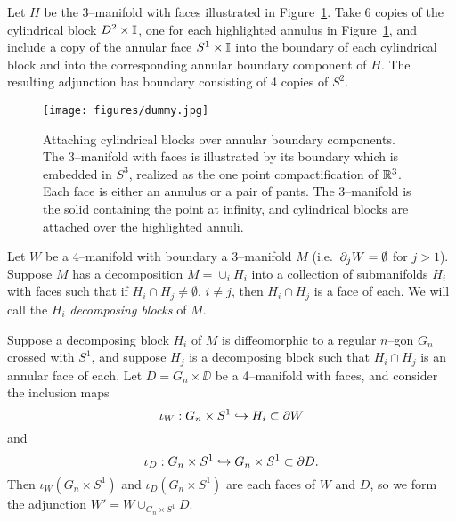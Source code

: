 \begin{ex}
	\label{ex:interactivefiber2uDxI}
	Let $H$ be the 3--manifold with faces illustrated in Figure~\ref{fig:interactivefiber2uDxI}.
	Take 6 copies of the cylindrical block $D^2\times\mathbb{I}$, one for each highlighted annulus in Figure~\ref{fig:interactivefiber2uDxI}, and include a copy of the annular face $S^1\times\mathbb{I}$ into the boundary of each cylindrical block and into the corresponding annular boundary component of $H$.
	The resulting adjunction has boundary consisting of 4 copies of $S^2$.
\end{ex}

\begin{figure}[H]
	\centering
	\caption{Attaching cylindrical blocks over annular boundary components.
		The 3--manifold with faces is illustrated by its boundary which is embedded in $S^3$, realized as the one point compactification of $ \mathbb{R}^3 $.
		Each face is either an annulus or a pair of pants.
		The 3--manifold is the solid containing the point at infinity, and cylindrical blocks are attached over the highlighted annuli.}
	\texttt{[image: figures/dummy.jpg]}
	\label{fig:interactivefiber2uDxI}
\end{figure}

\begin{ex}
	Let $W$ be a 4--manifold with boundary a 3--manifold $M$ (i.e.\ $ \partial_j W =\emptyset$ for $j>1$).
	Suppose $M$ has a decomposition $M=\cup_i H_i$ into a collection of submanifolds $H_i$ with faces such that if $H_i\cap H_j\neq\emptyset$, $i\neq j$, then $H_i\cap H_j$ is a face of each.
	We will call the $H_i$ \emph{decomposing blocks} of $M$.
	
	Suppose a decomposing block $H_i$ of $M$ is diffeomorphic to a regular $n$--gon $G_n$ crossed with $S^1$, and suppose $H_j$ is a decomposing block such that $H_i\cap H_j$ is an annular face of each.
	Let $D=G_n\times\DD$ be a 4--manifold with faces, and consider the inclusion maps
	\[
		\iota_W:G_n\times S^1\hookrightarrow H_i\subset \partial W 
	\]
	and
	\[
		\iota_D:G_n\times S^1\hookrightarrow G_n\times S^1\subset \partial D.
	\]
	Then $\iota_W(G_n\times S^1)$ and $\iota_D(G_n\times S^1)$ are each faces of $W$ and $D$, so we form the adjunction $W'=W\cup_{G_n\times S^1} D$.
	
	
	
\end{ex}


